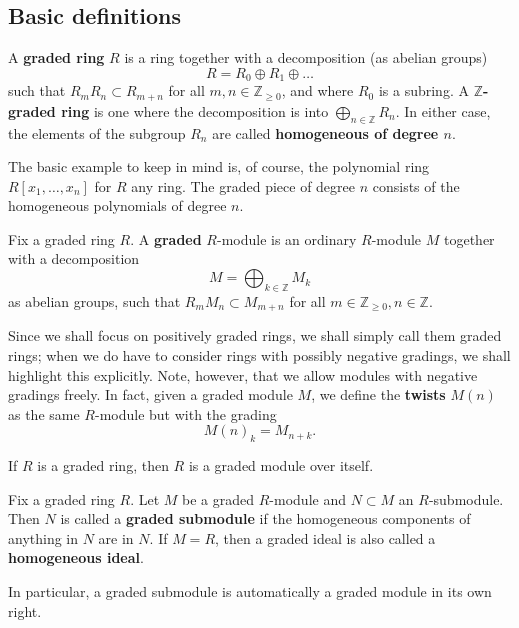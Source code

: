 \subsection{Basic definitions}
\begin{definition} 
A \textbf{graded ring} $R$ is a ring together with a decomposition (as abelian groups)
\[  R = R_0 \oplus R_1 \oplus \dots   \]
such that $R_m R_n \subset R_{m+n}$ for all $m, n \in \mathbb{Z}_{\geq 0}$,
and where $R_0$ is a subring.
A \textbf{$\mathbb{Z}$-graded ring} is one where the decomposition is into
$\bigoplus_{n \in \mathbb{Z}} R_n$.
In either case, the elements of the subgroup $R_n$ are called
\textbf{homogeneous of degree $n$}.
\end{definition}

The basic example to keep in mind is, of course, the polynomial ring $R[x_1,
\dots, x_n]$ for $R$ any ring. The graded piece of degree $n$ consists of the
homogeneous polynomials of degree $n$.

\begin{definition} Fix a graded ring $R$.
A \textbf{graded} $R$-module is an ordinary $R$-module $M$ together with  a decomposition
\[  M = \bigoplus_{k \in \mathbb{Z}} M_k  \]
as abelian groups, such that $R_m M_n \subset M_{m+n}$ for all $m \in
\mathbb{Z}_{\geq 0}, n \in \mathbb{Z}$.
\end{definition} 

Since we shall focus on positively graded rings, we shall simply call them
graded rings; when we do have to consider rings with possibly negative
gradings, we shall highlight this explicitly. Note, however, that we allow
modules with negative gradings freely.
In fact, given a graded module $M$, we define the \textbf{twists} $M(n)$ as the
same $R$-module but with the grading
\[  M(n)_k = M_{n+k} . \]  

\begin{example} 
If $R$ is  a graded ring, then $R$ is a graded module over itself. 
\end{example} 

\begin{definition} Fix a graded ring $R$.
Let $M$ be a graded $R$-module and $N \subset M$ an $R$-submodule. Then $N$ is called  a
\textbf{graded submodule} if the homogeneous components of anything in $N$ are
in $N$. If $M=R$, then a graded ideal is also called a \textbf{homogeneous
ideal}.
\end{definition} 

In particular, a graded submodule is automatically a graded module in its own
right. 

